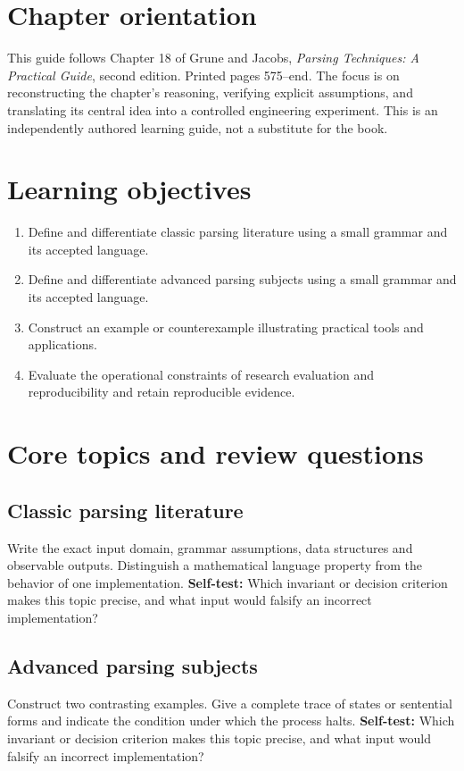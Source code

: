 \documentclass[11pt,letterpaper]{article}
\begin{document}
\makedoctitle\makedocsummary
\tableofcontents\clearpage
\section{Chapter orientation}
This guide follows Chapter 18 of Grune and Jacobs, \emph{Parsing Techniques: A Practical Guide}, second edition. Printed pages 575--end. The focus is on reconstructing the chapter's reasoning, verifying explicit assumptions, and translating its central idea into a controlled engineering experiment. This is an independently authored learning guide, not a substitute for the book.
\section{Learning objectives}
\begin{enumerate}
\item Define and differentiate classic parsing literature using a small grammar and its accepted language.
\item Define and differentiate advanced parsing subjects using a small grammar and its accepted language.
\item Construct an example or counterexample illustrating practical tools and applications.
\item Evaluate the operational constraints of research evaluation and reproducibility and retain reproducible evidence.
\end{enumerate}
\section{Core topics and review questions}
\subsection{Classic parsing literature}
Write the exact input domain, grammar assumptions, data structures and observable outputs. Distinguish a mathematical language property from the behavior of one implementation.
\textbf{Self-test:} Which invariant or decision criterion makes this topic precise, and what input would falsify an incorrect implementation?
\subsection{Advanced parsing subjects}
Construct two contrasting examples. Give a complete trace of states or sentential forms and indicate the condition under which the process halts.
\textbf{Self-test:} Which invariant or decision criterion makes this topic precise, and what input would falsify an incorrect implementation?
\end{document}

